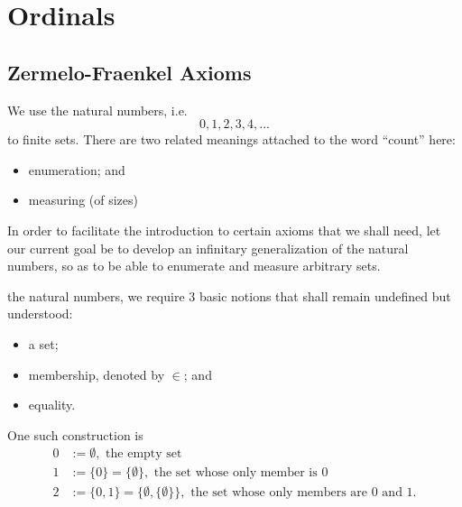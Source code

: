 \documentclass[notoc,notitlepage]{tufte-book}
\begin{document}

\section{Ordinals}%
\label{sec:ordinals}

\subsection{Zermelo-Fraenkel Axioms}%
\label{sub:zermelo_fraenkel_axioms}

We use the natural numbers, i.e.
\begin{equation*}
  0, 1, 2, 3, 4, ...
\end{equation*}
to  finite sets. There are two related meanings attached to the word ``count'' here:
\begin{itemize}
  \item enumeration; and
  \item measuring (of sizes)
\end{itemize}

In order to facilitate the introduction to certain axioms that we shall need, let our current goal be to develop an infinitary generalization of the natural numbers, so as to be able to enumerate and measure arbitrary sets.

 the natural numbers, we require 3 basic notions that shall remain undefined but understood:
\begin{itemize}
  \item a set;
  \item membership, denoted by $\in$; and
  \item equality.
\end{itemize}

One such construction is
\begin{align*}
  0 &:= \emptyset, \text{ the empty set } \\
  1 &:= \{0\} = \{ \emptyset \}, \text{ the set whose only member is } 0 \\
  2 &:= \{0, 1\} = \{ \emptyset, \{ \emptyset \} \}, \text{ the set whose only members are } 0 \text{ and } 1.
\end{align*}
\end{document}
